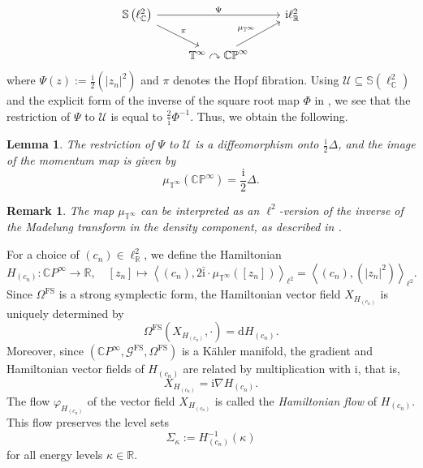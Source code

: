 \documentclass[12pt]{amsart}
\newtheorem{lemma}[lemma]{Lemma}
\newtheorem{remark}[remark]{Remark}
\numberwithin{figure}{section}
\numberwithin{table}{section}
\numberwithin{equation}{section}
\def\RR{\mathbb{R}}
\def\i{\mathrm{i}}
\begin{document}
\begin{equation}
	\begin{tikzcd}
		\mathbb{S}\left(\ell^2_{\mathbb{C}}\right) \arrow[rr, "\Psi"] \arrow[rd, "\pi"] & & \mathrm{i} \ell^2_{\mathbb{R}} \\
		& \mathbb{T}^\infty \curvearrowright \mathbb{CP}^\infty \arrow[ru, "\mu_{\mathbb{T}^\infty}"] &
	\end{tikzcd}
\end{equation}
where \(\Psi(z) := \frac{\mathrm{i}}{2} (|z_n|^2)\) and \(\pi\) denotes the Hopf fibration. Using \(\mathcal{U} \subseteq \mathbb{S}\left(\ell^2_{\mathbb{C}}\right)\) and the explicit form of the inverse of the square root map \(\varPhi\) in , we see that the restriction of \(\Psi\) to \(\mathcal{U}\) is equal to \(\frac{2}{\mathrm{i}} \varPhi^{-1}\). Thus, we obtain the following.

\begin{lemma}\label{l: momentmap image}
	The restriction of \(\Psi\) to \(\mathcal{U}\) is a diffeomorphism onto \(\frac{\mathrm{i}}{2} \Delta\), and the image of the momentum map is given by
	\[
	\mu_{\mathbb{T}^\infty}(\mathbb{CP}^\infty) = \frac{\mathrm{i}}{2} \Delta.
	\]
\end{lemma}

\begin{remark}
The map \( \mu_{\mathbb{T}^{\infty}} \) can be interpreted as an \(\ell^2\)-version of the inverse of the Madelung transform in the density component, as described in \cite[Prop.~4.3]{khesin_geometry_2019}.
\end{remark}

For a choice of \( (c_n) \in \ell^2_{\RR} \), we define the Hamiltonian
\begin{equation}\label{eq defi Hamiltonian on CP}
    H_{(c_n)} : \mathbb{C}P^\infty \longrightarrow \mathbb{R}, \quad [z_n] \mapsto \left\langle (c_n), 2\bar{\i} \cdot \mu_{\mathbb{T}^\infty}([z_n]) \right\rangle_{\ell^2} = \left\langle (c_n), (|z_n|^2) \right\rangle_{\ell^2}.
\end{equation}
Since \( \Omega^{\mathrm{FS}} \) is a strong symplectic form, the Hamiltonian vector field \( X_{H_{(c_n)}} \) is uniquely determined by
\[
\Omega^{\mathrm{FS}}(X_{H_{(c_n)}}, \cdot) = \mathrm{d}H_{(c_n)}.
\]
Moreover, since \( (\mathbb{C}P^\infty, \mathcal{G}^{\mathrm{FS}}, \Omega^{\mathrm{FS}}) \) is a Kähler manifold, the gradient and Hamiltonian vector fields of \( H_{(c_n)} \) are related by multiplication with \( \mathrm{i} \), that is,
\[
X_{H_{(c_n)}}=\i \nabla H_{(c_n)}.
\]
The flow \( \varphi_{H_{(c_n)}} \) of the vector field \( X_{H_{(c_n)}} \) is called the \emph{Hamiltonian flow} of \( H_{(c_n)} \). This flow preserves the level sets
\[
\Sigma_{\kappa}:= H_{(c_n)}^{-1}(\kappa)
\]
for all energy levels \( \kappa \in \mathbb{R} \).
\end{document}
